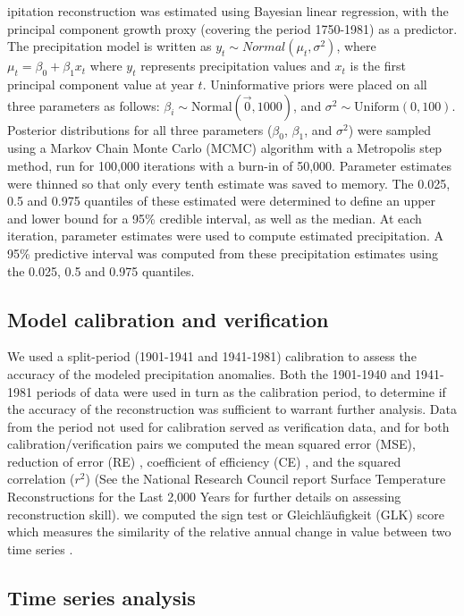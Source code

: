 ipitation reconstruction was estimated using Bayesian linear
regression, with the principal component growth proxy (covering the
period 1750-1981) as a predictor. The precipitation model is written
as $y_t \sim Normal( \mu_t, \sigma^2)$, where $\mu_t = \beta_0 +
\beta_1 x_t$ where $y_t$ represents precipitation values and $x_t$
is the first principal component value at year $t$. Uninformative
priors were placed on all three parameters as follows: $\beta_i \sim
\text{Normal}(\vec{0},1000)$, and $\sigma^2 \sim \text{Uniform}(0,100)$.
Posterior distributions for all three parameters ($\beta_0$, $\beta_1$,
and $\sigma^2$) were sampled using a Markov Chain Monte Carlo (MCMC)
algorithm with a Metropolis step method, run for 100,000 iterations with
a burn-in of 50,000. Parameter estimates were thinned so that only every
tenth estimate was saved to memory. The 0.025, 0.5 and 0.975 quantiles
of these estimated were determined to define an upper and lower bound
for a 95\% credible interval, as well as the median. At each iteration,
parameter estimates were used to compute estimated precipitation. A 95\%
predictive interval was computed from these precipitation estimates
using the 0.025, 0.5 and 0.975 quantiles.

\subsection{Model calibration and verification} \label{cal_ver}

We used a split-period (1901-1941 and 1941-1981) calibration to
assess the accuracy of the modeled precipitation anomalies. Both
the 1901-1940 and 1941-1981 periods of data were used in turn as the
calibration period, to determine if the accuracy of the reconstruction
was sufficient to warrant further analysis. Data from the period
not used for calibration served as verification data, and for both
calibration/verification pairs we computed the mean squared error
(MSE), reduction of error (RE) \cite{fritts1976tree}, coefficient of
efficiency (CE) \cite{cook1994spatial}, and the squared correlation
($r^2$) (See the National Research Council report Surface Temperature
Reconstructions for the Last 2,000 Years \cite{national2006surface}
for further details on assessing reconstruction skill). %
we computed the sign test or Gleichl\"{a}ufigkeit (GLK) score which
measures the similarity of the relative annual change in value between
two time series \cite{speer2010fundamentals, schweingruber1988tree}.

\subsection{Time series analysis}


